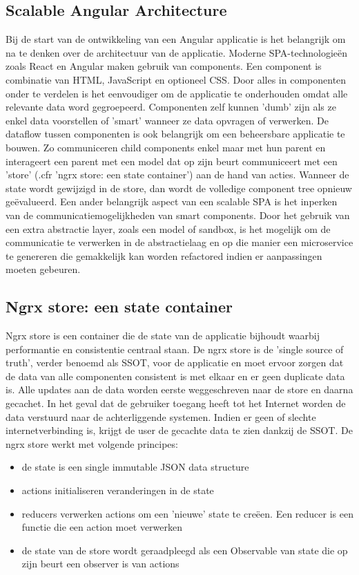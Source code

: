 \subsection{Scalable Angular Architecture}
Bij de start van de ontwikkeling van een Angular applicatie is het belangrijk om na te denken over de architectuur van de applicatie. Moderne SPA-technologie\"en zoals React en Angular maken gebruik van components. Een component is combinatie van HTML, JavaScript en optioneel CSS. Door alles in componenten onder te verdelen is het eenvoudiger om de applicatie te onderhouden omdat alle relevante data word gegroepeerd. Componenten zelf kunnen 'dumb' zijn als ze enkel data voorstellen of 'smart' wanneer ze data opvragen of verwerken.
De dataflow tussen componenten is ook belangrijk om een beheersbare applicatie te bouwen. Zo communiceren child components enkel maar met hun parent en interageert een parent met een model dat op zijn beurt communiceert met een 'store' (.cfr 'ngrx store: een state container') aan de hand van acties. Wanneer de state wordt gewijzigd in de store, dan wordt de volledige component tree opnieuw ge\"evalueerd. Een ander belangrijk aspect van een scalable SPA is het inperken van de communicatiemogelijkheden van smart components. Door het gebruik van een extra abstractie layer, zoals een model of sandbox, is het mogelijk om de communicatie te verwerken in de abstractielaag en op die manier een microservice te genereren die gemakkelijk kan worden refactored indien er aanpassingen moeten gebeuren.
\subsection{Ngrx store: een state container}
Ngrx store is een container die de state van de applicatie bijhoudt waarbij performantie en consistentie centraal staan. De ngrx store is de 'single source of truth', verder benoemd als SSOT, voor de applicatie en moet ervoor zorgen dat de data van alle componenten consistent is met elkaar en er geen duplicate data is. Alle updates aan de data worden eerste weggeschreven naar de store en daarna gecachet. In het geval dat de gebruiker toegang heeft tot het Internet worden de data verstuurd naar de achterliggende systemen. Indien er geen of slechte internetverbinding is, krijgt de user de gecachte data te zien dankzij de SSOT. De ngrx store werkt met volgende principes:
\begin{itemize}  
\item de state is een single immutable JSON data structure
\item actions initialiseren veranderingen in de state
\item reducers verwerken actions om een 'nieuwe' state te cre\"een. Een reducer is een functie die een action moet verwerken
\item de state van de store wordt geraadpleegd als een Observable van state die op zijn beurt een observer is van actions
\end{itemize}
